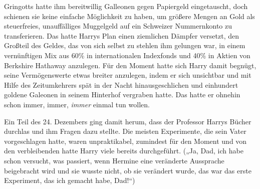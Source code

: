 Gringotts hatte ihm bereitwillig Galleonen gegen Papiergeld eingetauscht, doch schienen sie keine einfache Möglichkeit zu haben, um größere Mengen an Gold als steuerfreies, unauffälliges Muggelgeld auf ein Schweizer Nummernkonto zu transferieren. Das hatte Harrys Plan einen ziemlichen Dämpfer versetzt, den Großteil des Geldes, das von sich selbst zu stehlen ihm gelungen war, in einem vernünftigen Mix aus 60\% in internationalen Indexfonds und 40\% in Aktien von Berkshire Hathaway anzulegen.%
Für den Moment hatte sich Harry damit begnügt, seine Vermögenswerte etwas breiter anzulegen, indem er sich unsichtbar und mit Hilfe des Zeitumkehrers spät in der Nacht hinausgeschlichen und einhundert goldene Galeonen in seinem Hinterhof vergraben hatte. Das hatte er ohnehin schon immer, immer, \emph{immer} einmal tun wollen.

Ein Teil des 24. Dezembers ging damit herum, dass der Professor Harrys Bücher durchlas und ihm Fragen dazu stellte. Die meisten Experimente, die sein Vater vorgeschlagen hatte, waren unpraktikabel, zumindest für den Moment und von den verbleibenden hatte Harry viele bereits durchgeführt. („Ja, Dad, ich habe schon versucht, was passiert, wenn Hermine eine veränderte Aussprache beigebracht wird und sie wusste nicht, ob sie verändert wurde, das war das erste Experiment, das ich gemacht habe, Dad!“)

